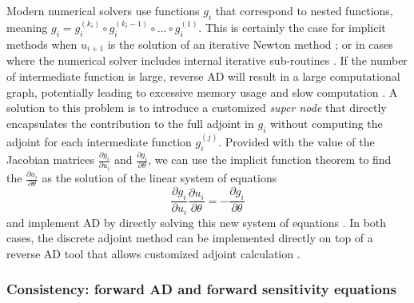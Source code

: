 Modern numerical solvers use functions $g_i$ that correspond to nested functions, meaning $g_i = g_i^{(k_i)} \circ g_i^{(k_i-1)} \circ \ldots \circ g_i^{(1)} $. 
This is certainly the case for implicit methods when $u_{i+1}$ is the solution of an iterative Newton method \cite{SUNDIALS-hindmarsh2005sundials}; or in cases where the numerical solver includes internal iterative sub-routines \cite{Alexe_Sandu_2009}.
If the number of intermediate function is large, reverse AD will result in a large computational graph, potentially leading to excessive memory usage and slow computation \cite{Margossian_2018, Alexe_Sandu_2009}.
A solution to this problem is to introduce a customized \textit{super node} that directly encapsulates the contribution to the full adjoint in $g_i$ without computing the adjoint for each intermediate function $g_i^{(j)}$.
Provided with the value of the Jacobian matrices $\frac{\partial g_i}{\partial u_i}$ and $\frac{\partial g_i}{\partial \theta}$, we can use the implicit function theorem to find 
the $\frac{\partial u_i}{\partial \theta}$ as the solution of the linear system of equations
\begin{equation}
    \frac{\partial g_i}{\partial u_i} \frac{\partial u_i}{\partial \theta} = -\frac{\partial g_i}{\partial \theta}
\end{equation}
and implement AD by directly solving this new system of equations \cite{christianson1994reverse, christianson1998reverse, Bell_Burke_2008}. 
In both cases, the discrete adjoint method can be implemented directly on top of a reverse AD tool that allows customized adjoint calculation \cite{rackauckas2021generalized}. 


\subsubsection{Consistency: forward AD and forward sensitivity equations}
\label{section:forwardAD-sensitivity}


